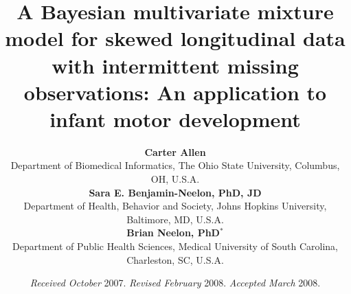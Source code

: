 \documentclass[useAMS,usenatbib,referee]{biom}
\title[]{A Bayesian multivariate mixture model for skewed longitudinal data with intermittent missing observations: An application to infant motor development}
\author
{\textbf{Carter Allen} \\
Department of Biomedical Informatics, The Ohio State University, Columbus, OH, U.S.A.\\
\textbf{Sara E. Benjamin-Neelon, PhD, JD} \\
Department of Health, Behavior and Society, Johns Hopkins University, Baltimore, MD, U.S.A.\\
\textbf{Brian Neelon, PhD}$^*$\email{neelon@musc.edu} \\
Department of Public Health Sciences, Medical University of South Carolina, Charleston, SC, U.S.A.}
\begin{document}

\date{{\it Received October} 2007. {\it Revised February} 2008.  {\it
Accepted March} 2008.}



\pagerange{\pageref{firstpage}--\pageref{lastpage}}




\label{firstpage}

\end{document}
